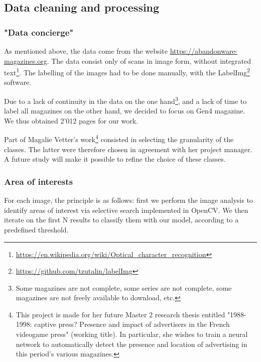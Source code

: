 \documentclass[10pt,conference,compsocconf]{IEEEtran}
\begin{document}
\subsection{Data cleaning and processing}


\subsubsection{"Data concierge"}

As mentioned above, the data come from the website \url{https://abandonware-magazines.org}. The data consist only of scans in image form, without integrated text\footnote{\url{https://en.wikipedia.org/wiki/Optical_character_recognition}}. The labelling of the images had to be done manually, with the LabelImg\footnote{\url{https://github.com/tzutalin/labelImg}} software.

Due to a lack of continuity in the data on the one hand\footnote{Some magazines are not complete, some series are not complete, some magazines are not freely available to download, etc.}, and a lack of time to label all magazines on the other hand, we decided to focus on Gen4 magazine. We thus obtained 2'012 pages for our work.

Part of Magalie Vetter's work\footnote{This project is made for her future Master 2 research thesis entitled "1988-1998: captive press? Presence and impact of advertisers in the French videogame press" (working title). In particular, she wishes to train a neural network to automatically detect the presence and location of advertising in this period's various magazines.} consisted in selecting the granularity of the classes. The latter were therefore chosen in agreement with her project manager. A future study will make it possible to refine the choice of these classes.

\subsubsection{Area of interests}
For each image, the principle is as follows: first we perform the image analysis to identify areas of interest via selective search\cite{ss} implemented in OpenCV. We then iterate on the first N results to classify them with our model, according to a predefined threshold.
\end{document}
